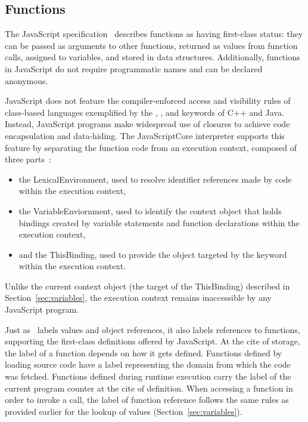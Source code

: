 \subsection{Functions}

The JavaScript specification~\cite{ecma} describes functions as having first-class status: they can be passed as arguments to other functions, returned as values from function calls, assigned to variables, and stored in data structures.
Additionally, functions in JavaScript do not require programmatic names and can be declared anonymous.

JavaScript does not feature the compiler-enforced access and visibility rules of class-based languages exemplified by the , , and  keywords of C++ and Java.
Instead, JavaScript programs make widespread use of closures to achieve code encapsulation and data-hiding.
The JavaScriptCore interpreter supports this feature by separating the function code from an execution context, composed of three parts~\cite{ecma}:
\begin{itemize}
  \item the LexicalEnvironment, used to resolve identifier references made by code within the execution context,
  \item the VariableEnviornment, used to identify the context object that holds bindings created by variable statements and function declarations within the execution context,
  \item and the ThisBinding, used to provide the object targeted by the  keyword within the execution context.
\end{itemize}
Unlike the current context object (the target of the ThisBinding) described in Section~\ref{sec:variables}, the execution context remains inaccessible by any JavaScript program.

Just as \FlowCore\ labels values and object references, it also labels references to functions, supporting the first-class definitions offered by JavaScript.
At the cite of storage, the label of a function depends on how it gets defined.
Functions defined by loading source code have a label representing the domain from which the code was fetched.
Functions defined during runtime execution carry the label of the current program counter at the cite of definition.
When accessing a function in order to invoke a call, the label of function reference follows the same rules as provided earlier for the lookup of values (Section~\ref{sec:variables}).

